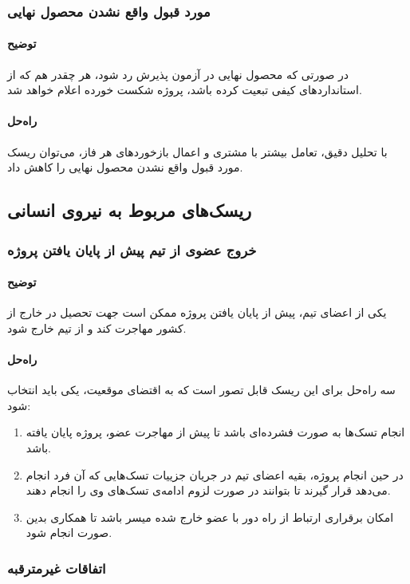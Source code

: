 \subsubsection{مورد قبول واقع نشدن محصول نهایی}
\paragraph{توضیح}
در صورتی که محصول نهایی در آزمون پذیرش رد شود، هر چقدر هم که از استانداردهای کیفی تبعیت کرده باشد، پروژه شکست خورده اعلام خواهد شد.
\paragraph{راه‌حل}
با تحلیل دقیق، تعامل بیشتر با مشتری و اعمال بازخوردهای هر فاز، می‌توان ریسک مورد قبول واقع نشدن محصول نهایی را کاهش داد.

\subsection{ریسک‌های مربوط به نیروی انسانی}
\subsubsection{خروج عضوی از تیم پیش از پایان یافتن پروژه}
\paragraph{توضیح}
یکی از اعضای تیم، پیش از پایان یافتن پروژه ممکن است جهت تحصیل در خارج از کشور مهاجرت کند و از تیم خارج شود.
\paragraph{راه‌حل}
سه راه‌حل برای این ریسک قابل تصور است که به اقتضای موقعیت، یکی باید انتخاب شود:
\begin{enumerate}
	\item انجام تسک‌ها به صورت فشرده‌ای باشد تا پیش از مهاجرت عضو، پروژه پایان یافته باشد.
	\item در حین انجام پروژه، بقیه اعضای تیم در جریان جزییات تسک‌هایی که آن فرد انجام می‌دهد قرار گیرند تا بتوانند در صورت لزوم ادامه‌ی تسک‌های وی را انجام دهند.
	\item امکان برقراری ارتباط از راه دور با عضو خارج شده میسر باشد تا همکاری بدین صورت انجام شود.
\end{enumerate}
\subsubsection{اتفاقات غیرمترقبه}
